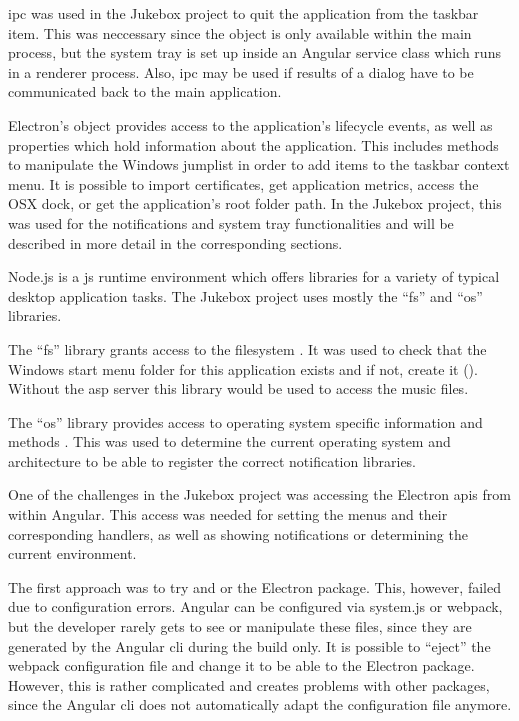 \gls{ipc} was used in the Jukebox project to quit the application from the taskbar item. This was neccessary since the  object is only available within the main process, but the system tray is set up inside an Angular service class which runs in a renderer process. Also, \gls{ipc} may be used if results of a dialog have to be communicated back to the main application.


Electron's  object provides access to the application's lifecycle events, as well as properties which hold information about the application. This includes methods to manipulate the Windows jumplist in order to add items to the taskbar context menu. It is possible to import certificates, get application metrics, access the OSX dock, or get the application's root folder path. In the Jukebox project, this was used for the notifications and system tray functionalities and will be described in more detail in the corresponding sections.


Node.js is a \gls{js} runtime environment which offers libraries for a variety of typical desktop application tasks. The Jukebox project uses mostly the \enquote{fs} and \enquote{os} libraries.

The \enquote{fs} library grants access to the filesystem \cite{nodejsFS}. It was used to check that the Windows start menu folder for this application exists and if not, create it (). Without the \gls{asp} server this library would  be used to access the music files.

The \enquote{os} library provides access to operating system specific information and methods \cite{nodejsOS}. This was used to determine the current operating system and architecture to be able to register the correct notification libraries.


One of the challenges in the Jukebox project was accessing the Electron \gls{api}s from within Angular. This access was needed for setting the menus and their corresponding  handlers, as well as showing notifications or determining the current environment.


The first approach was to try and  or  the Electron package. This, however, failed due to configuration errors. Angular can be configured via system.js or webpack, but the developer rarely gets to see or manipulate these files, since they are generated by the Angular \gls{cli} during the build only. It is possible to \enquote{eject} the webpack configuration file and change it to be able to  the Electron package. However, this is rather complicated and creates problems with other packages, since the Angular \gls{cli} does not automatically adapt the configuration file anymore. \cite{electronRequireError}

